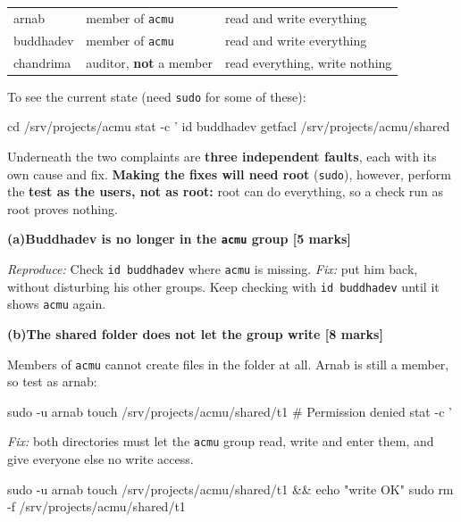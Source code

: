\documentclass[11pt,a4paper]{article}
\newcommand{\hd}[1]{\medskip\textbf{#1}\par\nopagebreak}
\begin{document}
\begin{enumerate}[label=\textbf{Q\arabic*.},leftmargin=2.6em,labelsep=0.6em,itemsep=1.6em,topsep=1.2em]
\begin{framed}
\smallskip
\begin{tabular}{@{}>{\ttfamily}l l l@{}}
arnab     & member of \texttt{acmu}        & read and write everything \\
buddhadev & member of \texttt{acmu}        & read and write everything \\
chandrima & auditor, \textbf{not} a member & read everything, write nothing \\
\end{tabular}
\smallskip

To see the current state (need \texttt{sudo} for some of these):
\begin{shell}
cd /srv/projects/acmu
stat -c '%
id buddhadev
getfacl /srv/projects/acmu/shared
\end{shell}
\end{framed}

Underneath the two complaints are \textbf{three independent faults}, each with
its own cause and fix. 
\textbf{Making the fixes will need root} (\texttt{sudo}), however, perform the \textbf{test as the users, not as root:} root can do everything, so a check run as root proves
nothing.

\hd{(a)\enspace Buddhadev is no longer in the \texttt{acmu} group \hfill [5 marks]}
\textit{Reproduce:} Check \verb|id buddhadev| where \texttt{acmu} is missing.
\textit{Fix:} put him back, without disturbing his other groups. Keep checking with \verb|id buddhadev| until it shows \texttt{acmu} again.

\hd{(b)\enspace The shared folder does not let the group write \hfill [8 marks]}
Members of \texttt{acmu} cannot create files in the folder at all. Arnab is still a member, so test as arnab:
\begin{shell}
sudo -u arnab touch /srv/projects/acmu/shared/t1     # Permission denied
stat -c '%
\end{shell}
\textit{Fix:} both directories must let the \texttt{acmu} group read, write and
enter them, and give everyone else no write access. 

\begin{shell}
sudo -u arnab touch /srv/projects/acmu/shared/t1 && echo "write OK"
sudo rm -f /srv/projects/acmu/shared/t1
\end{shell}


\end{enumerate}
\end{document}
